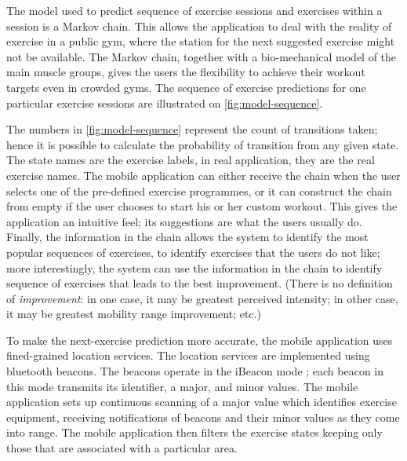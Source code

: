 
The model used to predict sequence of exercise sessions and exercises within a session is a Markov chain. This allows the application to deal with the reality of exercise in a public gym, where the station for the next suggested exercise might not be available. The Markov chain, together with a bio-mechanical model of the main muscle groups, gives the users the flexibility to achieve their workout targets even in crowded gyms. The sequence of exercise predictions for one particular exercise sessions are illustrated on \autoref{fig:model-sequence}.


The numbers in \autoref{fig:model-sequence} represent the count of transitions taken; hence it is possible to calculate the probability of transition from any given state. The state names are the exercise labels, in real application, they are the real exercise names. The mobile application can either receive the chain when the user selects one of the pre-defined exercise programmes, or it can construct the chain from empty if the user chooses to start his or her custom workout. This gives the application an intuitive feel; its suggestions are what the users usually do. Finally, the information in the chain allows the system to identify the most popular sequences of exercises, to identify exercises that the users do not like; more interestingly, the system can use the information in the chain to identify sequence of exercises that leads to the best improvement. (There is no definition of \emph{improvement}: in one case, it may be greatest perceived intensity; in other case, it may be greatest mobility range improvement; etc.)

To make the next-exercise prediction more accurate, the mobile application uses fined-grained location services. The location services are implemented using bluetooth beacons. The beacons operate in the iBeacon mode \cite{ibeacon}; each beacon in this mode transmits its identifier, a major, and minor values. The mobile application sets up continuous scanning of a major value which identifies exercise equipment, receiving notifications of beacons and their minor values as they come into range. The mobile application then filters the exercise states keeping only those that are associated with a particular area.

